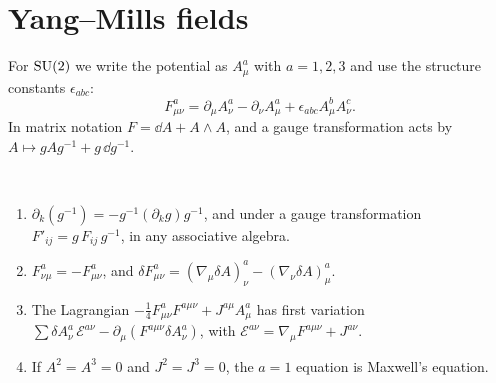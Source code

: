 \section{Yang--Mills fields}

For $\mathrm{SU}(2)$ we write the potential as $A^a_\mu$ with $a=1,2,3$ and use the structure constants $\epsilon_{abc}$:
\[
F^a_{\mu\nu}=\partial_\mu A^a_\nu-\partial_\nu A^a_\mu+\epsilon_{abc}A^b_\mu A^c_\nu .
\]
In matrix notation $F=\dd A+A\wedge A$, and a gauge transformation acts by $A\mapsto gAg^{-1}+g\,\dd g^{-1}$.

\begin{theorem}\label{thm:ymvar}\ver\
\begin{enumerate}[label=(\roman*)]
\item $\partial_k(g^{-1})=-g^{-1}(\partial_kg)g^{-1}$, and under a gauge transformation $F'_{ij}=g\,F_{ij}\,g^{-1}$, in any associative algebra.
\item $F^a_{\nu\mu}=-F^a_{\mu\nu}$, and $\delta F^a_{\mu\nu}=(\nabla_\mu\delta A)^a_\nu-(\nabla_\nu\delta A)^a_\mu$.
\item The Lagrangian $-\frac14F^a_{\mu\nu}F^{a\mu\nu}+J^{a\mu}A^a_\mu$ has first variation $\sum\delta A^a_\nu\,\mathcal E^{a\nu}-\partial_\mu(F^{a\mu\nu}\delta A^a_\nu)$, with $\mathcal E^{a\nu}=\nabla_\mu F^{a\mu\nu}+J^{a\nu}$.
\item If $A^2=A^3=0$ and $J^2=J^3=0$, the $a=1$ equation is Maxwell's equation.
\end{enumerate}
\end{theorem}
